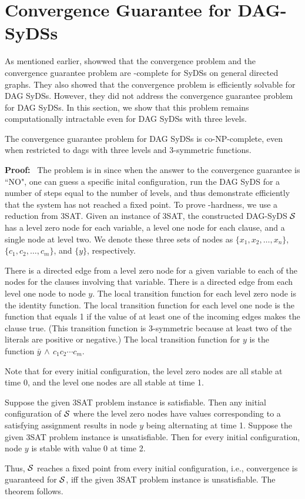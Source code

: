 \section{Convergence Guarantee for DAG-SyDSs}
\label{sec:conv_guarantee}

As mentioned earlier, \cite{Chistikov-etal-2020}
showwed that the convergence problem and the convergence
guarantee problem are \cpsp-complete for SyDSs on general directed
graphs.
They also showed that the convergence problem is efficiently
solvable for DAG SyDSs.
However, they did not address the convergence guarantee problem
for DAG SyDSs.
In this section, we show that this problem 
remains computationally intractable even for
DAG SyDSs with three levels.

\begin{theorem}\label{thm:convergence_guaranee}
The convergence guarantee problem for DAG SyDSs is co-NP-complete,
even when restricted to dags with three levels and 3-symmetric functions.
\end{theorem}

\noindent
\textbf{Proof:}~ The problem is in \cconp{} since when the answer to the
convergence guarantee is ``NO", one can guess a specific inital configuration,
run the DAG SyDS for a number of steps equal to the number of levels, and
thus demonstrate efficiently that the system has not reached a fixed point.
To prove \cnp-hardness, we use a reduction from 3SAT.
Given an instance of 3SAT,
the constructed DAG-SyDS $\mbox{$\mathcal{S}$}$ has a level zero node for each variable, 
a level one node for each clause, and a single node at level two.
We denote these three sets of nodes as $\{x_1, x_2, \ldots , x_n\}$,
$\{c_1,c_2, \ldots , c_m\}$, and $\{y\}$, respectively.

There is a directed edge from a  level zero node for a given variable
to each of  the nodes for the clauses involving that variable.
There is a directed edge from each level one node to node $y$.  The
local transition function for each level zero node is the identity
function.  The local transition function for each level one node
is the function that equals 1
if the value of at least one of the incoming edges
makes the clause true.  (This transition function is 3-symmetric
because at least two of the literals are positive or negative.) The
local transition function for $y$ is the function 
$\bar{y} \, \wedge \, c_1 c_2 \cdots  c_{m}$.

Note that for every initial configuration, the level zero nodes are
all stable at time 0, and the level one nodes are all stable at
time 1.

Suppose the given 3SAT problem instance is satisfiable.
Then any initial configuration of $\mbox{$\mathcal{S}$}$ where the level zero nodes 
have values corresponding to a satisfying assignment
results in node $y$ being alternating at time 1.
Suppose the given 3SAT problem instance is unsatisfiable.
Then for every initial configuration, node $y$ is stable with value 0 at time 2.

\smallskip
Thus, $\mbox{$\mathcal{S}$}$ reaches a fixed point from every initial configuration, 
i.e.,  convergence is guaranteed for $\mbox{$\mathcal{S}$}$,
iff the given 3SAT problem instance is unsatisfiable.
The theorem follows.
\QED
